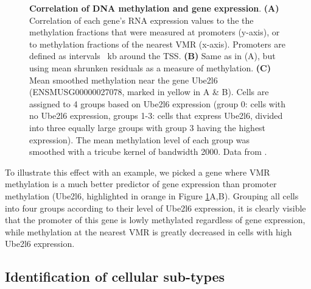 \documentclass[twocolumn,10pt]{article}
\begin{document}
\begin{figure}
\begin{center}
    \end{center}
    \caption{\small \textbf{Correlation of DNA methylation and gene expression}.
    \textbf{(A)} Correlation of each gene's RNA expression values to the the methylation fractions that were measured at promoters (y-axis), or to methylation fractions of the nearest VMR (x-axis). Promoters are defined as intervals ~kb around the TSS.
    \textbf{(B)} Same as in (A), but using mean shrunken residuals as a measure of methylation.
    \textbf{(C)} Mean smoothed methylation near the gene Ube2l6 (ENSMUSG00000027078, marked in yellow in A \& B). Cells are assigned to 4 groups based on Ube2l6 expression (group 0: cells with no Ube2l6 expression, groups 1-3: cells that express Ube2l6, divided into three equally large groups with group 3 having the highest expression). The mean methylation level of each group was smoothed with a tricube kernel of bandwidth 2000.
    Data from \citet{argelaguet2019gastru}.}
    \label{figure:correlation}
\end{figure}

To illustrate this effect with an example, we picked a gene where VMR methylation is a much better predictor of gene expression than promoter methylation (Ube2l6, highlighted in orange in Figure \ref{figure:correlation}A,B).
Grouping all cells into four groups according to their level of Ube2l6 expression, it is clearly visible that the promoter of this gene is lowly methylated regardless of gene expression, while methylation at the nearest VMR is greatly decreased in cells with high Ube2l6 expression.

\subsection{Identification of cellular sub-types}
\end{document}
